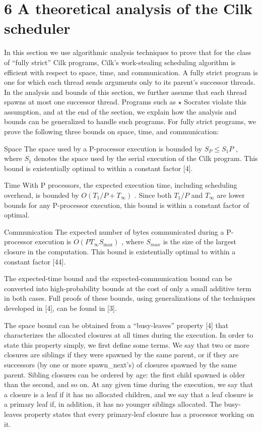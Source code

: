 \documentclass[
]{article}
\begin{document}
\section{6 A theoretical analysis of the Cilk
scheduler}\label{a-theoretical-analysis-of-the-cilk-scheduler}

In this section we use algorithmic analysis techniques to prove that for
the class of ``fully strict'' Cilk programs, Cilk's work-stealing
scheduling algorithm is efficient with respect to space, time, and
communication. A fully strict program is one for which each thread sends
arguments only to its parent's successor threads. In the analysis and
bounds of this section, we further assume that each thread spawns at
most one successor thread. Programs such as \(\star\) Socrates violate
this assumption, and at the end of the section, we explain how the
analysis and bounds can be generalized to handle such programs. For
fully strict programs, we prove the following three bounds on space,
time, and communication:

Space The space used by a P-processor execution is bounded by
\(S_{P} \leq S_{1}P\) , where \(S_{1}\) denotes the space used by the
serial execution of the Cilk program. This bound is existentially
optimal to within a constant factor {[}4{]}.

Time With P processors, the expected execution time, including
scheduling overhead, is bounded by \(O(T_{1}/P + T_{\infty})\) . Since
both \(T_{1}/P\) and \(T_{\infty}\) are lower bounds for any P-processor
execution, this bound is within a constant factor of optimal.

Communication The expected number of bytes communicated during a
P-processor execution is \(O(PT_{\infty}S_{\max})\) , where \(S_{max}\)
is the size of the largest closure in the computation. This bound is
existentially optimal to within a constant factor {[}44{]}.

The expected-time bound and the expected-communication bound can be
converted into high-probability bounds at the cost of only a small
additive term in both cases. Full proofs of these bounds, using
generalizations of the techniques developed in {[}4{]}, can be found in
{[}3{]}.

The space bound can be obtained from a ``busy-leaves'' property {[}4{]}
that characterizes the allocated closures at all times during the
execution. In order to state this property simply, we first define some
terms. We say that two or more closures are siblings if they were
spawned by the same parent, or if they are successors (by one or more
spawn\_next's) of closures spawned by the same parent. Sibling closures
can be ordered by age: the first child spawned is older than the second,
and so on. At any given time during the execution, we say that a closure
is a leaf if it has no allocated children, and we say that a leaf
closure is a primary leaf if, in addition, it has no younger siblings
allocated. The busy-leaves property states that every primary-leaf
closure has a processor working on it.
\end{document}
